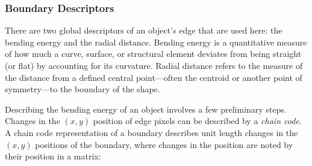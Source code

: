 \documentclass[letterpaper, notitlepage]{report}
\begin{document}
{\subsubsection{Boundary Descriptors}
There are two global descriptors of an object's edge that are used here: the bending energy and the radial distance.  Bending energy is a quantitative measure of how much a curve, surface, or structural element deviates from being straight (or flat) by accounting for its curvature. Radial distance refers to the measure of the distance from a defined central point—often the centroid or another point of symmetry—to the boundary of the shape.

Describing the bending energy of an object involves a few preliminary steps. Changes in the $(x,y)$ position of edge pixels can be described by a \textit{chain code}. A chain code representation of a boundary describes unit length changes in the $(x,y)$ positions of the boundary,  where changes in the position are noted by their position in a matrix:

}
\end{document}

